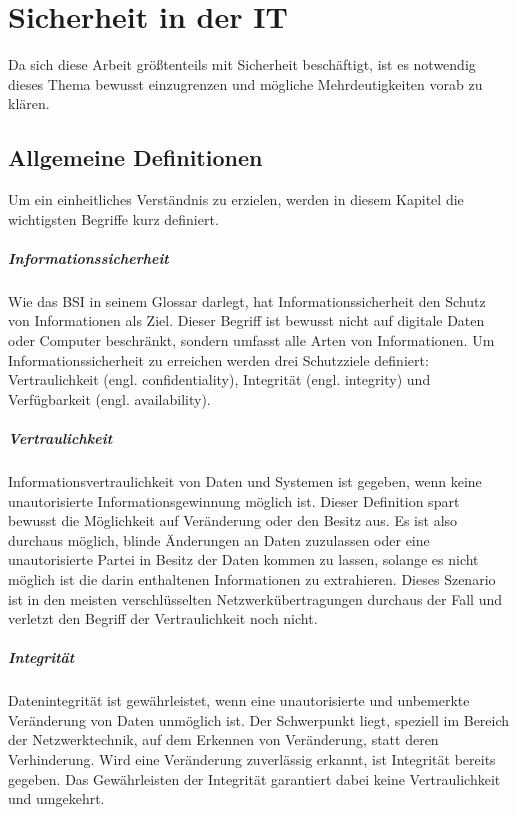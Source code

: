 \chapter{Sicherheit in der IT}
\label{chap:itsecurity}
Da sich diese Arbeit größtenteils mit Sicherheit beschäftigt, ist es notwendig dieses Thema bewusst einzugrenzen und mögliche Mehrdeutigkeiten vorab zu klären.

\section{Allgemeine Definitionen}
Um ein einheitliches Verständnis zu erzielen, werden in diesem Kapitel die wichtigsten Begriffe kurz definiert.

\paragraph{Informationssicherheit}
Wie das \ac{BSI} in seinem Glossar darlegt, hat Informationssicherheit den Schutz von Informationen als Ziel\cite{BSIGlossar}. Dieser Begriff ist bewusst nicht auf digitale Daten oder Computer beschränkt, sondern umfasst alle Arten von Informationen. Um Informationssicherheit zu erreichen werden drei Schutzziele definiert: Vertraulichkeit (engl. confidentiality), Integrität (engl. integrity) und Verfügbarkeit (engl. availability).

\paragraph{Vertraulichkeit}
Informationsvertraulichkeit von Daten und Systemen ist gegeben, wenn keine unautorisierte Informationsgewinnung möglich ist\cite[p. 10]{Eckert2013}. Dieser Definition spart bewusst die Möglichkeit auf Veränderung oder den Besitz aus. Es ist also durchaus möglich, blinde Änderungen an Daten zuzulassen oder eine unautorisierte Partei in Besitz der Daten kommen zu lassen, solange es nicht möglich ist die darin enthaltenen Informationen zu extrahieren. Dieses Szenario ist in den meisten verschlüsselten Netzwerkübertragungen durchaus der Fall und verletzt den Begriff der Vertraulichkeit noch nicht.    

\paragraph{Integrität}
Datenintegrität ist gewährleistet, wenn eine unautorisierte und unbemerkte Veränderung von Daten unmöglich ist\cite[p. 9]{Eckert2013}. Der Schwerpunkt liegt, speziell im Bereich der Netzwerktechnik, auf dem Erkennen von Veränderung, statt deren Verhinderung. Wird eine Veränderung zuverlässig erkannt, ist Integrität bereits gegeben. Das Gewährleisten der Integrität garantiert dabei keine Vertraulichkeit und umgekehrt.

